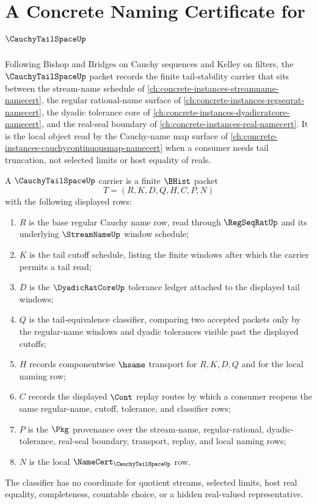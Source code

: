 \chapter{A Concrete Naming Certificate for $\CauchyTailSpaceUp$}
\label{ch:concrete-instances-cauchy-tail-space-namecert}

Following Bishop and Bridges on Cauchy sequences and Kelley on filters, the $\CauchyTailSpaceUp$ packet records the finite tail-stability carrier that sits between the stream-name schedule of \autoref{ch:concrete-instances-streamname-namecert}, the regular rational-name surface of \autoref{ch:concrete-instances-regseqrat-namecert}, the dyadic tolerance core of \autoref{ch:concrete-instances-dyadicratcore-namecert}, and the real-seal boundary of \autoref{ch:concrete-instances-real-namecert}. It is the local object read by the Cauchy-name map surface of \autoref{ch:concrete-instances-cauchycontinuousmap-namecert} when a consumer needs tail truncation, not selected limits or host equality of reals.

\begin{definition}
\label{def:cauchy-tail-space-carrier}
A $\CauchyTailSpaceUp$ carrier is a finite $\BHist$ packet
$$
T=(R,K,D,Q,H,C,P,N)
$$
with the following displayed rows:
\begin{enumerate}
\item $R$ is the base regular Cauchy name row, read through $\RegSeqRatUp$ and its underlying $\StreamNameUp$ window schedule;
\item $K$ is the tail cutoff schedule, listing the finite windows after which the carrier permits a tail read;
\item $D$ is the $\DyadicRatCoreUp$ tolerance ledger attached to the displayed tail windows;
\item $Q$ is the tail-equivalence classifier, comparing two accepted packets only by the regular-name windows and dyadic tolerances visible past the displayed cutoffs;
\item $H$ records componentwise $\hsame$ transport for $R,K,D,Q$ and for the local naming row;
\item $C$ records the displayed $\Cont$ replay routes by which a consumer reopens the same regular-name, cutoff, tolerance, and classifier rows;
\item $P$ is the $\Pkg$ provenance over the stream-name, regular-rational, dyadic-tolerance, real-seal boundary, transport, replay, and local naming rows;
\item $N$ is the local $\NameCert_{\CauchyTailSpaceUp}$ row.
\end{enumerate}
The classifier has no coordinate for quotient streams, selected limits, host real equality, completeness, countable choice, or a hidden real-valued representative.
\end{definition}

